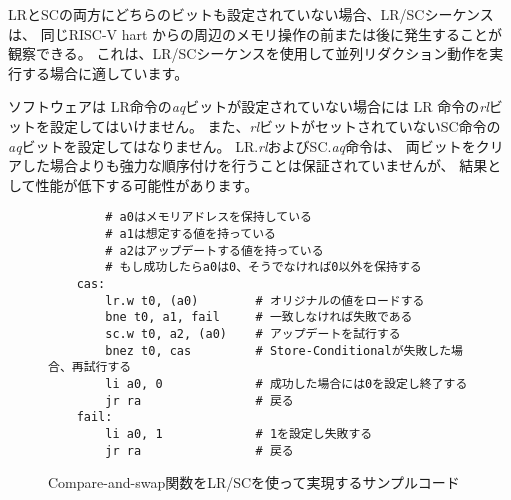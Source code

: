 LRとSCの両方にどちらのビットも設定されていない場合、LR/SCシーケンスは、
同じRISC-V hart からの周辺のメモリ操作の前または後に発生することが観察できる。
これは、LR/SCシーケンスを使用して並列リダクション動作を実行する場合に適しています。

\begin{comment}
Software should not set the {\em rl} bit on an LR instruction unless the {\em
aq} bit is also set, nor should software set the {\em aq} bit on an SC
instruction unless the {\em rl} bit is also set.  LR.{\em rl} and SC.{\em aq}
instructions are not guaranteed to provide any stronger ordering than those
with both bits clear, but may result in lower performance.
\end{comment}

ソフトウェアは LR命令の{\em aq}ビットが設定されていない場合には LR 命令の{\em rl}ビットを設定してはいけません。
また、{\em rl}ビットがセットされていないSC命令の{\em aq}ビットを設定してはなりません。
LR.{\em rl}およびSC.{\em aq}命令は、
両ビットをクリアした場合よりも強力な順序付けを行うことは保証されていませんが、
結果として性能が低下する可能性があります。

\begin{figure}[h!]
\begin{center}
\begin{comment}
\begin{verbatim}
        # a0 holds address of memory location 
        # a1 holds expected value
        # a2 holds desired value
        # a0 holds return value, 0 if successful, !0 otherwise
    cas:
        lr.w t0, (a0)        # Load original value.
        bne t0, a1, fail     # Doesn't match, so fail.
        sc.w t0, a2, (a0)    # Try to update.
        bnez t0, cas         # Retry if store-conditional failed.
        li a0, 0             # Set return to success.
        jr ra                # Return.
    fail:
        li a0, 1             # Set return to failure.
        jr ra                # Return.
\end{verbatim}
\end{comment}
\begin{verbatim}
        # a0はメモリアドレスを保持している
        # a1は想定する値を持っている
        # a2はアップデートする値を持っている
        # もし成功したらa0は0、そうでなければ0以外を保持する
    cas:
        lr.w t0, (a0)        # オリジナルの値をロードする
        bne t0, a1, fail     # 一致しなければ失敗である
        sc.w t0, a2, (a0)    # アップデートを試行する
        bnez t0, cas         # Store-Conditionalが失敗した場合、再試行する
        li a0, 0             # 成功した場合には0を設定し終了する
        jr ra                # 戻る
    fail:
        li a0, 1             # 1を設定し失敗する
        jr ra                # 戻る
\end{verbatim}
\end{center}
\begin{comment}
\caption{Sample code for compare-and-swap function using LR/SC.}
\end{comment}
\caption{Compare-and-swap関数をLR/SCを使って実現するサンプルコード}
\label{cas}
\end{figure}

